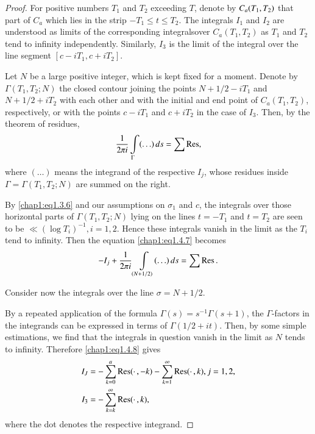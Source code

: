 \begin{proof}
For positive numbers $T_1$ and $T_2$ exceeding $T$, denote by
$C_a(T_1,\break T_2)$ that part of $C_a$ which lies in the strip $-T_1\leq
t\leq T_2$. The integrals $I_1$ and $I_2$ are understood as limits of
the corresponding integrals\pageoriginale over $C_a(T_1,T_2)$ as $T_1$
and $T_2$ tend to infinity independently. Similarly, $I_3$ is the
limit of the integral over the line segment $[c-iT_1,c+iT_2]$.

Let $N$ be a large positive integer, which is kept fixed for a
moment. Denote by $\Gamma(T_1,T_2;N)$ the closed contour joining the
points $N+1/2-iT_1$ and $N+1/2+iT_2$ with each other and with the
initial and end point of $C_a(T_1,T_2)$, respectively, or with the
points $c-iT_1$ and $c+iT_2$ in the case of $I_3$. Then, by the
theorem of residues, 
\begin{equation}\label{chap1:eq1.4.7}
\frac{1}{2\pi i}\int\limits_\Gamma(\ldots)\,ds = \sum \operatorname{Res}, 
\end{equation}
where $(\ldots)$ means the integrand of the respective $I_j$, whose
residues inside $\Gamma=\Gamma(T_1,T_2;N)$ are summed on the right.

By \eqref{chap1:eq1.3.6} and our assumptions on $\sigma_1$ and $c$,
the integrals over those horizontal parts of $\Gamma(T_1,T_2;N)$ lying
on the lines $t=-T_1$ and $t=T_2$ are seen to be $\ll(\log T_i)^{-1},
i=1,2$. Hence these integrals vanish in the limit as the $T_i$ tend to
infinity. Then the equation \eqref{chap1:eq1.4.7} becomes 
\begin{equation}\label{chap1:eq1.4.8}
-I_j+\frac{1}{2\pi i}\int\limits_{(N+1/2)}(\ldots)\,ds =\sum \operatorname{Res}. 
\end{equation}

Consider now the integrals over the line $\sigma=N+1/2$.

By a repeated application of the formula $\Gamma(s)=s^{-1}
\Gamma(s+1)$, the $\Gamma$-factors in the integrands can be expressed
in terms of $\Gamma(1/2+it)$. Then, by some simple estimations, we
find that the integrals in question vanish in the limit as $N$ tends
to infinity. Therefore \eqref{chap1:eq1.4.8} gives 
\begin{align}
I_J &= - \sum\limits_{k=0}^a \operatorname{Res}(\cdotp,-k)- \sum\limits_{k=1}^{\infty}
\operatorname{Res} (\cdotp,k), j =1,2,\label{chap1:eq1.4.9}\\
I_3 &= - \sum\limits_{k=k}^{\infty} \operatorname{Res}
(\cdotp,k),\label{chap1:eq1.4.10}  
\end{align}\pageoriginale
where the dot denotes the respective integrand.


\end{proof}
